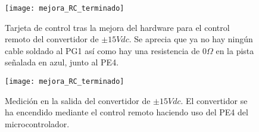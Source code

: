 \begin{figure}[!htb]
  \texttt{[image: mejora\_RC\_terminado]}
  \caption{Tarjeta de control tras la mejora del hardware para el control remoto del convertidor de $\pm15Vdc$. Se aprecia que ya no hay ningún cable soldado al PG1 así como hay una resistencia de $0\Omega$ en la pista señalada en azul, junto al PE4.}\label{fig:mejora_RC_terminado}
\endminipage\hfill
{}
  \texttt{[image: mejora\_RC\_terminado]}\caption{Medición en la salida del convertidor de $\pm15Vdc$. El convertidor se ha encendido mediante el control remoto haciendo uso del PE4 del microcontrolador.}\label{fig:mejora_RC_terminado}
\endminipage\hfill
\end{figure}

